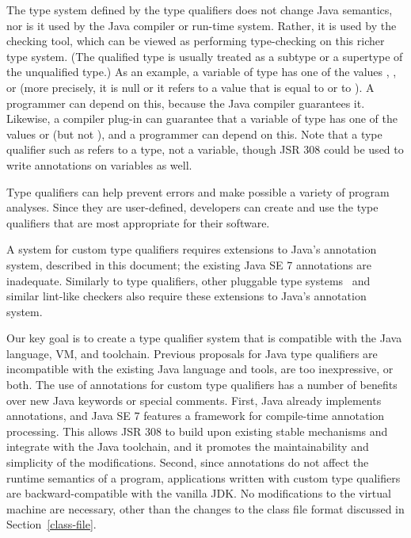 \documentclass[10pt]{article}
\begin{document}
The type system defined by the type qualifiers does not change Java
semantics, nor is it used by the Java compiler or run-time system.  Rather,
it is used by the checking tool, which can be viewed as performing
type-checking on this richer type system.  (The qualified type is usually
treated as a subtype or a supertype of the unqualified type.)
As an example, a variable of type  has one of the values
, , or  (more precisely, it is null or it
refers to a value that is equal to  or to \@).  A
programmer can depend on this, because the Java compiler guarantees it.
Likewise, a compiler plug-in can guarantee that a variable of type
 has one of the values  or 
(but not ), and a programmer can depend on this.  Note that a
type qualifier such as  refers to a type, not a variable,
though JSR 308 could be used to write annotations on variables as well.

Type qualifiers can help prevent errors and make possible a variety of
program analyses.  Since they are user-defined, developers can create
and use the type qualifiers that are most appropriate for their
software.

A system for custom type qualifiers requires
extensions to Java's annotation system, described in this document; the
existing Java SE 7 annotations are inadequate.
Similarly to type qualifiers, other pluggable type
systems~\cite{Bracha2004} and similar lint-like checkers also require these
extensions to Java's annotation system.

Our key goal is to create a type qualifier system that is compatible with
the Java language, VM, and toolchain.
Previous proposals
for Java type qualifiers are incompatible with the existing Java language
and tools, are too inexpressive, or both.
The use of annotations for custom type qualifiers has a number of
benefits over new Java keywords or special comments. First, Java
already implements annotations, and Java SE 7 features a framework
for compile-time annotation processing. This allows JSR 308 to
build upon existing stable mechanisms and integrate with the Java
toolchain, and it promotes the maintainability and simplicity of the
modifications. Second, since annotations do not affect the runtime
semantics of a program, applications written with custom type
qualifiers are backward-compatible with the vanilla JDK\@.
No modifications to the virtual machine are necessary,
other than the changes to the class file format discussed in
Section~\ref{class-file}.
\end{document}
